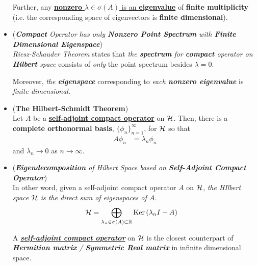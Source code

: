 \documentclass[11pt]{article}
\begin{document}
\begin{itemize}
\begin{theorem}
Further, any \underline{\textbf{nonzero} $\lambda \in \sigma(A)$ is an \textbf{eigenvalue}} of \textbf{finite multiplicity} 
(i.e. the corresponding space of eigenvectors is \textbf{finite dimensional}). 
\end{theorem}

\item \begin{remark} (\emph{\textbf{Compact} Operator has only \textbf{Nonzero Point Spectrum} with \textbf{Finite Dimensional Eigenspace}})\\
\emph{Riesz-Schauder Theorem} states that \emph{the \textbf{spectrum} for \textbf{compact} operator on \textbf{Hilbert} space} consists of \emph{only} the point spectrum besides $\lambda = 0$. 

Moreover, \emph{the \textbf{eigenspace}} corresponding to \emph{each \textbf{nonzero eigenvalue}} is \emph{finite dimensional}.
\end{remark}

\item \begin{theorem} (\textbf{The Hilbert-Schmidt Theorem})  \citep{reed1980methods}\\
Let $A$ be a \underline{\textbf{self-adjoint compact operator}} on ${\mathcal H}$. Then, there is a \textbf{complete orthonormal basis}, $\{\phi_n\}_{n=1}^{\infty}$, for ${\mathcal H}$ so that
\begin{align*}
A \phi_n &= \lambda_n \phi_n 
\end{align*} and $\lambda_n \rightarrow 0$ as $n \rightarrow \infty$.
\end{theorem}

\item \begin{remark} (\emph{\textbf{Eigendecomposition} of Hilbert Space based on \textbf{Self-Adjoint Compact Operator}})\\
In other word, given a self-adjoint compact operator $A$ on ${\mathcal H}$, \emph{the HIlbert space ${\mathcal H}$ is the direct sum of eigenspaces of $A$}.
\begin{align*}
{\mathcal H} &= \bigoplus_{\lambda_n \in \sigma(A) \subset {\mathbb R}}\text{Ker}\left(\lambda_n I - A\right)
\end{align*}

A \underline{\textbf{\emph{self-adjoint compact operator}}} on ${\mathcal H}$ is the closest counterpart of \emph{\textbf{Hermitian matrix} / \textbf{Symmetric Real matrix}} in infinite dimensional space.
\end{remark}


\end{itemize}
\end{document}
